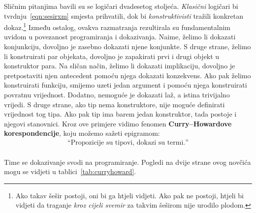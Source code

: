 Sličnim pitanjima bavili su se logičari dvadesetog stoljeća. \textit{Klasični} logičari bi tvrdnju~\ref{eqn:sesirxm} smjesta prihvatili,
dok bi \textit{konstruktivisti} tražili konkretan dokaz.\footnote{Ako takav šešir postoji, oni bi ga htjeli vidjeti. Ako pak ne postoji, htjeli bi vidjeti da traganje \textit{kroz cijeli svemir} za takvim šeširom nije urodilo plodom.}
Između ostalog, ovakva razmatranja rezultirala su fundamentalnim uvidom u povezanost programiranja i dokazivanja.
Naime, želimo li dokazati konjunkciju, dovoljno je zasebno dokazati njene konjunkte.
S druge strane, želimo li konstruirati par objekata, dovoljno je zapakirati prvi i drugi objekt u konstruktor para.
Na sličan način, želimo li dokazati implikaciju, dovoljno je pretpostaviti njen antecedent pomoću njega dokazati konzekvens.
Ako pak želimo konstruirati funkciju, smijemo uzeti jedan argument i pomoću njega konstruirati povratnu vrijednost.
Dodatno, nemoguće je dokazati laž, a istina trivijalno vrijedi.
S druge strane, ako tip nema konstruktore, nije moguće definirati vrijednost tog tipa.
Ako pak tip ima barem jedan konstruktor, tada postoje i njegovi stanovnici.
Kroz ove primjere vidimo fenomen \textbf{Curry--Howardove korespondencije}, koju možemo sažeti epigramom:
\begin{align*}
  \textrm{``Propozicije su tipovi, dokazi su termi.''}
\end{align*}
\\ Time se dokazivanje svodi na programiranje. Pogledi na dvije strane ovog novčića mogu se vidjeti u tablici~\ref{tab:curryhoward}.
